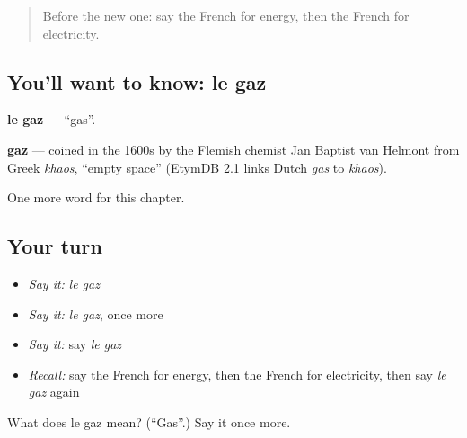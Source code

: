 \label{lesson:FR-C255-gaz}



\begin{quote}
Before the new one: say the French for energy, then the French for electricity.
\end{quote}

\subsection*{You'll want to know: le gaz}
\textbf{le gaz} — \textquotedblleft{}gas\textquotedblright{}.

\begin{cousinweb}
\textbf{gaz} — coined in the 1600s by the Flemish chemist Jan Baptist van Helmont from Greek \emph{khaos}, \textquotedblleft{}empty space\textquotedblright{} (EtymDB 2.1 links Dutch \emph{gas} to \emph{khaos}).
\end{cousinweb}

\begin{grammarlens}[title={What you've built}]
One more word for this chapter.
\end{grammarlens}

\subsection*{Your turn}
\begin{itemize}
\raggedright
  \item \emph{Say it:} \emph{le gaz}
  \item \emph{Say it:} \emph{le gaz}, once more
  \item \emph{Say it:} say \emph{le gaz}
  \item \emph{Recall:} say the French for energy, then the French for electricity, then say \emph{le gaz} again
\end{itemize}

\begin{tcolorbox}[breakable,colback=teal!4,colframe=teal!35!black,title={Before you move on}]
What does le gaz mean? (\textquotedblleft{}Gas\textquotedblright{}.) Say it once more.
\end{tcolorbox}
